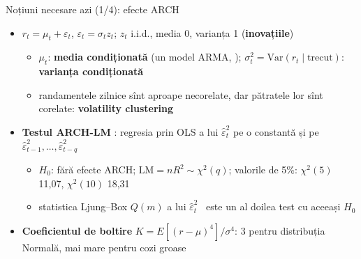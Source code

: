 \begin{frame}{Noțiuni necesare azi (1/4): efecte ARCH}
\itemsize{\small}
\begin{itemize}
    \item $r_t = \mu_t + \varepsilon_t$, $\varepsilon_t = \sigma_t z_t$; $z_t$ i.i.d., media 0, varianța 1 (\textbf{inovațiile})
    \begin{itemize}
        \item $\mu_t$: \textbf{media condiționată} (un model ARMA, ); $\sigma_t^2 = \mathrm{Var}(r_t \mid \text{trecut})$: \textbf{varianța condiționată}
        \item randamentele zilnice sînt aproape necorelate, dar pătratele lor sînt corelate: \textbf{volatility clustering}
    \end{itemize}
    \item \textbf{Testul ARCH-LM} : regresia prin OLS a lui $\hat\varepsilon_t^2$ pe o constantă și pe $\hat\varepsilon_{t-1}^2, \dots, \hat\varepsilon_{t-q}^2$
    \begin{itemize}
        \item $H_0$: fără efecte ARCH; $\mathrm{LM} = nR^2 \sim \chi^2(q)$; valorile de 5\%: $\chi^2(5)$ 11,07, $\chi^2(10)$ 18,31
        \item statistica Ljung--Box $Q(m)$ a lui $\hat\varepsilon_t^2$ \ este un al doilea test cu aceeași $H_0$
    \end{itemize}
    \item \textbf{Coeficientul de boltire} $K = E[(r - \mu)^4]/\sigma^4$: 3 pentru distribuția Normală, mai mare pentru cozi groase
\end{itemize}
\end{frame}

